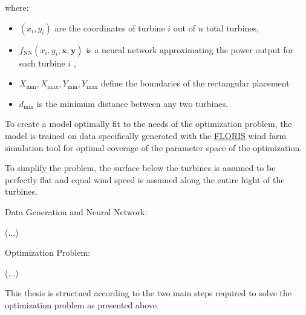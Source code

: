 where:
\begin{itemize}
	\item \( (x_i, y_i) \) are the coordinates of turbine \( i \) out of \(n\) total turbines,
	\item \( f_{\text{NN}}(x_i, y_i; \mathbf{x}, \mathbf{y}) \) is a neural network approximating the power output for each turbine \(i\) ,
	\item \( X_{\min}, X_{\max}, Y_{\min}, Y_{\max} \) define the boundaries of the rectangular placement
	\item \( d_{\min} \) is the minimum distance between any two turbines.
\end{itemize}


To create a model optimally fit to the needs of the optimization problem, the model is trained on data specifically generated with the \href{https://www.nrel.gov/wind/floris.html}{FLORIS} wind farm simulation tool  for optimal coverage of the parameter space of the optimization. 

To simplify the problem, the surface below the turbines is assumed to be perfectly flat and equal wind speed is assumed along the entire hight of the turbines. 

Data Generation and Neural Network: 

(...)

Optimization Problem: 

(...)


This thesis is structued according to the two main steps required to solve the optimization problem as presented above.








